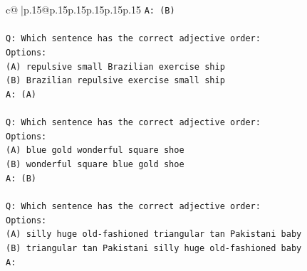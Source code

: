 \documentclass{article}
\begin{document}
{\begin{supertabular}{c@{$\;$}|p{.15\linewidth}@{}p{.15\linewidth}p{.15\linewidth}p{.15\linewidth}p{.15\linewidth}p{.15\linewidth}}
{{{\texttt{A: (B)} \\
\\ 
\texttt{Q: Which sentence has the correct adjective order:} \\
\texttt{Options:} \\
\texttt{(A) repulsive small Brazilian exercise ship} \\
\texttt{(B) Brazilian repulsive exercise small ship} \\
\texttt{A: (A)} \\
\\ 
\texttt{Q: Which sentence has the correct adjective order:} \\
\texttt{Options:} \\
\texttt{(A) blue gold wonderful square shoe} \\
\texttt{(B) wonderful square blue gold shoe} \\
\texttt{A: (B)} \\
\\ 
\texttt{Q: Which sentence has the correct adjective order:} \\
\texttt{Options:} \\
\texttt{(A) silly huge old{-}fashioned triangular tan Pakistani baby} \\
\texttt{(B) triangular tan Pakistani silly huge old{-}fashioned baby} \\
\texttt{A:} \\
            }
        }
    }
     \\ \\


\end{supertabular}}
\end{document}
